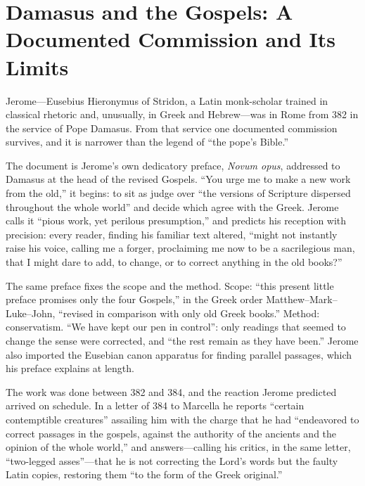 \section{Damasus and the Gospels: A Documented Commission and Its Limits}

Jerome---Eusebius Hieronymus of Stridon, a Latin monk-scholar trained in
classical rhetoric and, unusually, in Greek and Hebrew---was in Rome from
382 in the service of Pope Damasus. From that service one documented
commission survives, and it is narrower than the legend of ``the pope's
Bible.''

The document is Jerome's own dedicatory preface, \textit{Novum opus},
addressed to Damasus at the head of the revised Gospels. ``You urge me to
make a new work from the old,'' it begins: to sit as judge over ``the
versions of Scripture dispersed throughout the whole world'' and decide
which agree with the Greek. Jerome calls it ``pious work, yet perilous
presumption,'' and predicts his reception with precision: every reader,
finding his familiar text altered, ``might not instantly raise his voice,
calling me a forger, proclaiming me now to be a sacrilegious man, that I
might dare to add, to change, or to correct anything in the old
books?''

The same preface fixes the scope and the method. Scope: ``this present
little preface promises only the four Gospels,'' in the Greek order
Matthew--Mark--Luke--John, ``revised in comparison with only old Greek
books.'' Method: conservatism. ``We have kept our pen in control'': only
readings that seemed to change the sense were corrected, and ``the rest
remain as they have been.'' Jerome also imported the Eusebian canon
apparatus for finding parallel passages, which his preface explains at
length.

The work was done between 382 and 384, and the reaction Jerome predicted
arrived on schedule. In a letter of 384 to Marcella he reports ``certain
contemptible creatures'' assailing him with the charge that he had
``endeavored to correct passages in the gospels, against the authority of
the ancients and the opinion of the whole world,'' and answers---calling his critics, in the
same letter, ``two-legged asses''---that he is not correcting the Lord's
words but the faulty Latin copies, restoring them ``to the form of the
Greek original.''

